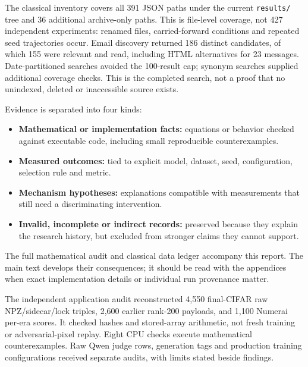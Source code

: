 \documentclass[
  british,
  10pt,
  a4paper,
]{article}
\providecommand{\tightlist}{%
  \setlength{\itemsep}{0pt}\setlength{\parskip}{0pt}}
\begin{document}
The classical inventory covers all 391 JSON paths under the current
\texttt{results/} tree and 36 additional archive-\allowbreak{}only
paths. This is file-level coverage, not 427 independent experiments:
renamed files, carried-\allowbreak{}forward conditions and repeated seed
trajectories occur. Email discovery returned 186 distinct
candidates,\allowbreak{} of which 155 were relevant and read, including
HTML alternatives for 23 messages. Date-\allowbreak{}partitioned
searches avoided the 100-result cap; synonym searches supplied
additional coverage checks. This is the completed search, not a proof
that no unindexed, deleted or inaccessible source exists.

Evidence is separated into four kinds:

\begin{itemize}
\tightlist
\item
  \textbf{Mathematical or implementation facts:} equations or behavior
  checked against executable code, including small reproducible
  counterexamp\allowbreak{}les.\allowbreak{}
\item
  \textbf{Measured outcomes:} tied to explicit model, dataset, seed,
  configuratio\allowbreak{}n,\allowbreak{} selection rule and metric.
\item
  \textbf{Mechanism hypotheses:} explanations compatible with
  measurements that still need a discriminating
  intervention\allowbreak{}.\allowbreak{}
\item
  \textbf{Invalid, incomplete or indirect records:} preserved because
  they explain the research history, but excluded from stronger claims
  they cannot support.
\end{itemize}

The full mathematical audit and classical data ledger accompany this
report. The main text develops their consequences; it should be read
with the appendices when exact implementation details or individual run
provenance matter.

The independent application audit reconstructed 4,550
final-\allowbreak{}CIFAR raw NPZ/\allowbreak{}sidecar/\allowbreak{}lock
triples, 2,600 earlier rank-200 payloads, and 1,100 Numerai per-era
scores. It checked hashes and stored-\allowbreak{}array
arithmetic,\allowbreak{} not fresh training or
adversarial-\allowbreak{}pixel replay. Eight CPU checks execute
mathematical counterexamp\allowbreak{}les.\allowbreak{} Raw Qwen judge
rows, generation tags and production training configurations received
separate audits, with limits stated beside findings.
\end{document}

